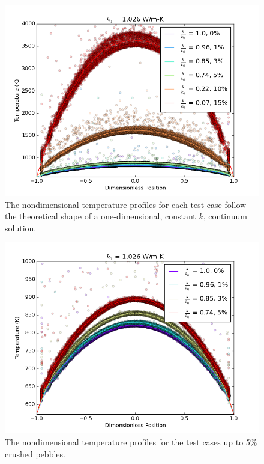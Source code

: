\begin{figure}[htbp]
    \centering
    \includegraphics[width=\singleimagewidth]{figures/dem-evap-0-15-scatter-keff.png}
    \caption{The nondimensional temperature profiles for each test case follow the theoretical shape of a one-dimensional, constant $k$, continuum solution.}
\label{fig:temp-scatters}
\end{figure}

\begin{figure}[htbp]
    \centering
    \includegraphics[width=\singleimagewidth]{figures/dem-evap-0-5-scatter-keff.png}
    \caption{The nondimensional temperature profiles for the test cases up to 5\% crushed pebbles.}
\label{fig:temp-scatters-zoomed}
\end{figure}


